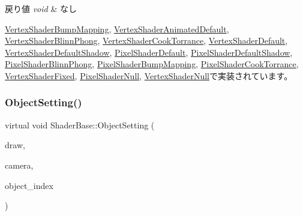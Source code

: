 \begin{DoxyRetVals}{戻り値}
{\em void} & なし \\
\hline
\end{DoxyRetVals}


\mbox{\hyperlink{class_vertex_shader_bump_mapping_aea3347e35f823d5272b4adcd2ca9724a}{Vertex\+Shader\+Bump\+Mapping}}, \mbox{\hyperlink{class_vertex_shader_animated_default_ad19fa307106654c4e8337db832018cc6}{Vertex\+Shader\+Animated\+Default}}, \mbox{\hyperlink{class_vertex_shader_blinn_phong_a5a5e76dcd64d4da2b2d3a4d9b1f4af21}{Vertex\+Shader\+Blinn\+Phong}}, \mbox{\hyperlink{class_vertex_shader_cook_torrance_a56c481293790c7269d6973e2ddae97f2}{Vertex\+Shader\+Cook\+Torrance}}, \mbox{\hyperlink{class_vertex_shader_default_a9ad7c52aa9f82f9cb0d2c60fde2bac4a}{Vertex\+Shader\+Default}}, \mbox{\hyperlink{class_vertex_shader_default_shadow_ae30039c4431a79ffd56609f599c72058}{Vertex\+Shader\+Default\+Shadow}}, \mbox{\hyperlink{class_pixel_shader_default_a18985aa792820858e214f141643119c4}{Pixel\+Shader\+Default}}, \mbox{\hyperlink{class_pixel_shader_default_shadow_adec247949dea3a73545f602641a99103}{Pixel\+Shader\+Default\+Shadow}}, \mbox{\hyperlink{class_pixel_shader_blinn_phong_a5b4b61a3d51610d6a41dfb3b25704421}{Pixel\+Shader\+Blinn\+Phong}}, \mbox{\hyperlink{class_pixel_shader_bump_mapping_ac1ff541401f121f7bd15b6e11cab997f}{Pixel\+Shader\+Bump\+Mapping}}, \mbox{\hyperlink{class_pixel_shader_cook_torrance_a0e658d9792cc15730c800db5a509fad9}{Pixel\+Shader\+Cook\+Torrance}}, \mbox{\hyperlink{class_vertex_shader_fixed_ab6e2024e01390866d778aa6db4085ac4}{Vertex\+Shader\+Fixed}}, \mbox{\hyperlink{class_pixel_shader_null_a89b6f0558a969478b06af52bb8e6ee16}{Pixel\+Shader\+Null}}, \mbox{\hyperlink{class_vertex_shader_null_a7bd853b15ab81cec44f1b6a1ea70a3a9}{Vertex\+Shader\+Null}}で実装されています。

\mbox{\label{class_shader_base_a054bc5e129619ec976740e0698ef9a8b}} 
\subsubsection{\texorpdfstring{Object\+Setting()}{ObjectSetting()}}
{\footnotesize\ttfamily virtual void Shader\+Base\+::\+Object\+Setting (\begin{DoxyParamCaption}\item[{\mbox{\hyperlink{class_draw_base}{Draw\+Base}} $\ast$}]{draw,  }\item[{\mbox{\hyperlink{class_camera}{Camera}} $\ast$}]{camera,  }\item[{unsigned}]{object\+\_\+index }\end{DoxyParamCaption})\hspace{0.3cm}{\ttfamily [pure virtual]}}



